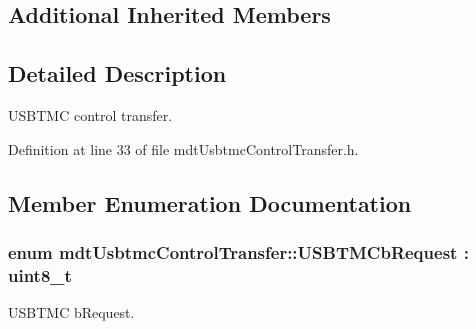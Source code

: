 \subsection*{Additional Inherited Members}


\subsection{Detailed Description}
U\-S\-B\-T\-M\-C control transfer. 

Definition at line 33 of file mdt\-Usbtmc\-Control\-Transfer.\-h.



\subsection{Member Enumeration Documentation}
\hypertarget{classmdt_usbtmc_control_transfer_a9f40cbd57464978b74624c66fa083251}{
\subsubsection[{U\-S\-B\-T\-M\-Cb\-Request}]{\setlength{\rightskip}{0pt plus 5cm}enum {\bf mdt\-Usbtmc\-Control\-Transfer\-::\-U\-S\-B\-T\-M\-Cb\-Request} \-: uint8\-\_\-t\hspace{0.3cm}{\ttfamily [strong]}}}\label{classmdt_usbtmc_control_transfer_a9f40cbd57464978b74624c66fa083251}


U\-S\-B\-T\-M\-C b\-Request. 

